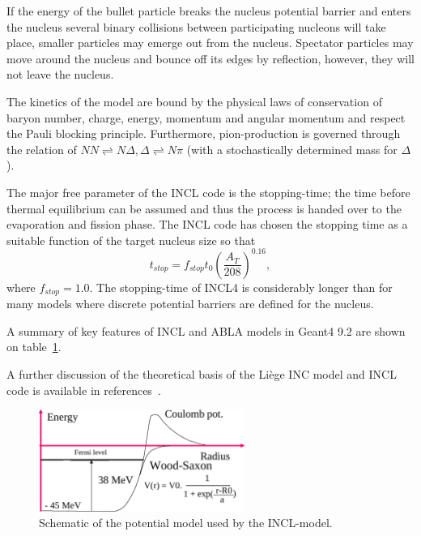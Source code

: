 If the energy of the bullet particle breaks the nucleus potential barrier and enters the nucleus several binary collisions between participating nucleons will take place, smaller particles may emerge out from the nucleus. Spectator particles may move around the nucleus and bounce off its edges by reflection, however, they will not leave the nucleus.

The kinetics of the model are bound by the physical laws of conservation of baryon number, charge, energy, momentum and angular momentum and respect the Pauli blocking principle. Furthermore, pion-production is governed through the relation of $NN \rightleftharpoons N \Delta, \Delta \rightleftharpoons N\pi$ (with a stochastically determined mass for $\Delta$).

The major free parameter of the INCL code is the stopping-time; the time before thermal equilibrium can be assumed and thus the process is handed over to the evaporation and fission phase. The INCL code has chosen the stopping time as a suitable function of the target nucleus size so that \begin{equation}t_{stop} = f_{stop}t_{0}(\frac{A_T}{208})^{0.16},\end{equation} where $f_{stop} = 1.0$. The stopping-time of INCL4 is considerably longer than for many models where discrete potential barriers are defined for the nucleus.

A summary of key features of INCL and ABLA models in Geant4 9.2 are shown on table~\ref{fig:inclpotential}.

A further discussion of the theoretical basis of the Liège INC model and INCL code is available in references~\cite{PhysRevC.66.044615,iia,incl42cascadeandabla}.

\begin{figure}[ht]
\begin{center}
\includegraphics[width=0.6\textwidth]{images/inclPotential.png}  
\caption{\label{fig:inclpotential} Schematic of the potential model used by the INCL-model.}
\end{center}
\end{figure}

